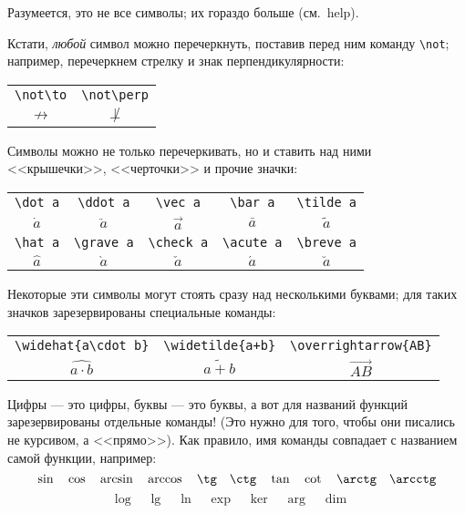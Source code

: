 \documentclass{article}
\begin{document}
\medskip

Разумеется, это не все символы; их гораздо больше (см.~help).

\bigskip

Кстати, \emph{любой} символ можно перечеркнуть, поставив перед ним команду \verb"\not"; например, перечеркнем стрелку и знак перпендикулярности: 
\begin{center}
\begin{tabular}{cc}
\verb"\not\to" & \verb"\not\perp" \\
     $\not\to$ &      $\not\perp$ \\
\end{tabular}
\end{center}

\bigskip

Символы можно не только перечеркивать, но и ставить над ними <<крышечки>>, <<черточки>> и прочие значки:
\begin{center}
\begin{tabular}{ccccc}
\verb"\dot a"  & \verb"\ddot a"  &  \verb"\vec a"  & \verb"\bar a"   & \verb"\tilde a" \\
     $\dot a$  &      $\ddot a$  &       $\vec a$  &      $\bar a$   &      $\tilde a$ \\[2mm]
\verb"\hat a"  & \verb"\grave a" & \verb"\check a" & \verb"\acute a" & \verb"\breve a" \\
     $\hat a$  &      $\grave a$ &      $\check a$ &      $\acute a$ &      $\breve a$ \\
\end{tabular}
\end{center}

\bigskip

Некоторые эти символы могут стоять сразу над несколькими буквами; для таких значков зарезервированы специальные команды:
\begin{center}
\noindent\begin{tabular}{ccc}
\verb"\widehat{a\cdot b}" & \verb"\widetilde{a+b}" & \verb"\overrightarrow{AB}" \\[1mm]
     $\widehat{a\cdot b}$ &      $\widetilde{a+b}$ &      $\overrightarrow{AB}$ \\
\end{tabular}
\end{center}


Цифры --- это цифры, буквы --- это буквы, а вот для названий функций зарезервированы отдельные команды! (Это нужно для того, чтобы они писались не курсивом, а <<прямо>>). Как правило, имя команды совпадает с названием самой функции, например:
\[
\sin \quad
\cos \quad
\arcsin \quad
\arccos \quad
\tg \quad
\ctg \quad
\tan \quad
\cot \quad
\arctg \quad
\arcctg
\]
\[
\log \quad
\lg \quad
\ln \quad
\exp \quad
\ker \quad
\arg \quad
\dim \quad
\]
\end{document}
